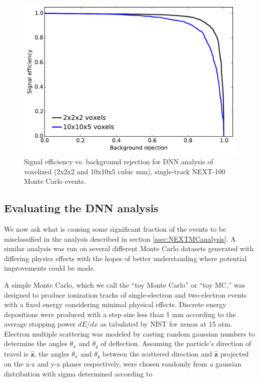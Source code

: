 \documentclass[a4paper,11pt]{article}
\begin{document}
\begin{figure}[!htb]
	\centering
	\includegraphics[scale=0.6]{fig/sigvsbg_DNN.pdf}
	\caption{\label{fig_svsb}Signal efficiency vs. background rejection for DNN analysis of voxelized (2x2x2 and 10x10x5 cubic mm), single-track NEXT-100 Monte Carlo events.}
\end{figure}

\subsection{Evaluating the DNN analysis}\label{ssec:DNNeval}
We now ask what is causing some significant fraction of the events to be misclassified in the analysis described in section \ref{ssec:NEXTMCanalysis}.  A similar analysis was run on 
several different Monte Carlo datasets generated with differing physics effects with the hopes of better understanding where potential improvements could be made.

A simple Monte Carlo, which we call the ``toy Monte Carlo'' or ``toy MC,'' was designed to produce ionization tracks of single-electron and two-electron events with a fixed energy
considering minimal physical effects.  Discrete energy depositions were produced with a step size less than 1 mm according to the average stopping power $dE/dx$ as tabulated by
NIST \cite{NIST_mac} for xenon at 15 atm.  Electron multiple scattering was modeled by casting random gaussian numbers to determine the angles $\theta_{x}$ and $\theta_{y}$ of deflection.  Assuming the particle's direction of travel is $\hat{\mathbf{z}}$, the angles $\theta_{x}$ and $\theta_{y}$ between the scattered direction and $\hat{\mathbf{z}}$ projected on 
the x-z and y-z planes respectively, were chosen randomly from a gaussian distribution with sigma determined according to
\end{document}
